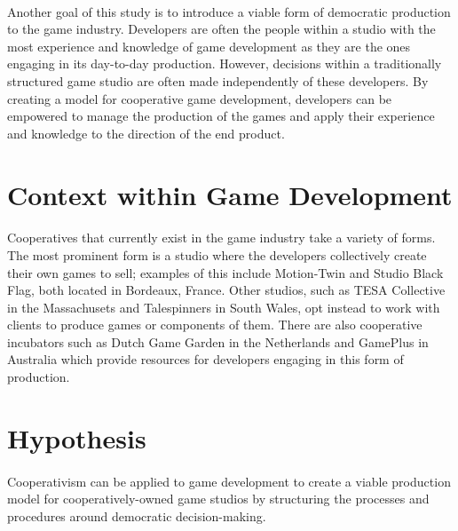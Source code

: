 \paragraph{} Another goal of this study is to introduce a viable form of democratic production to the game industry. Developers are often the people within a studio with the most experience and knowledge of game development as they are the ones engaging in its day-to-day production. However, decisions within a traditionally structured game studio are often made independently of these developers. By creating a model for cooperative game development, developers can be empowered to manage the production of the games and apply their experience and knowledge to the direction of the end product.

\section{Context within Game Development}

\paragraph{} Cooperatives that currently exist in the game industry take a variety of forms. The most prominent form is a studio where the developers collectively create their own games to sell; examples of this include Motion-Twin and Studio Black Flag, both located in Bordeaux, France. Other studios, such as TESA Collective in the Massachusets and Talespinners in South Wales, opt instead to work with clients to produce games or components of them. There are also cooperative incubators such as Dutch Game Garden in the Netherlands and GamePlus in Australia which provide resources for developers engaging in this form of production.

\section{Hypothesis}

\paragraph{} Cooperativism can be applied to game development to create a viable production model for cooperatively-owned game studios by structuring the processes and procedures around democratic decision-making.